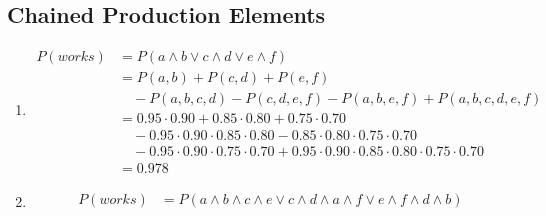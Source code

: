 \documentclass[fleqn,12pt]{scrartcl}
\begin{document}
\subsection{Chained Production Elements}
\begin{enumerate}
	\item
\begin{align*}
	P(works) &= P(a\wedge b \vee c\wedge d \vee e\wedge f)\\
							 &= P(a, b) + P(c, d) + P (e, f) \\ &\quad- P(a,b,c,d) - P(c,d,e,f) - P(a,b,e,f) + P(a,b,c,d,e,f)\\
								 &=0.95\cdot 0.90 + 0.85 \cdot 0.80 + 0.75\cdot0.70 \\
					 &\quad- 0.95\cdot0.90\cdot0.85\cdot0.80 - 0.85\cdot0.80\cdot0.75\cdot0.70\\
								 &\quad- 0.95\cdot0.90\cdot0.75\cdot0.70 + 0.95\cdot0.90\cdot0.85\cdot0.80\cdot0.75\cdot0.70 \\
					 &=0.978
\end{align*}
\item
	\begin{align*}
		P(works) &= P(a\wedge b\wedge c\wedge e \vee c\wedge d \wedge a \wedge f \vee e\wedge f\wedge d \wedge b)\\
	\end{align*}
\end{enumerate}
\end{document}
